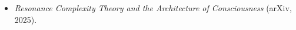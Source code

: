 \begin{itemize}[nosep]
  \item \emph{Resonance Complexity Theory and the Architecture of Consciousness} (arXiv, 2025).
\end{itemize}